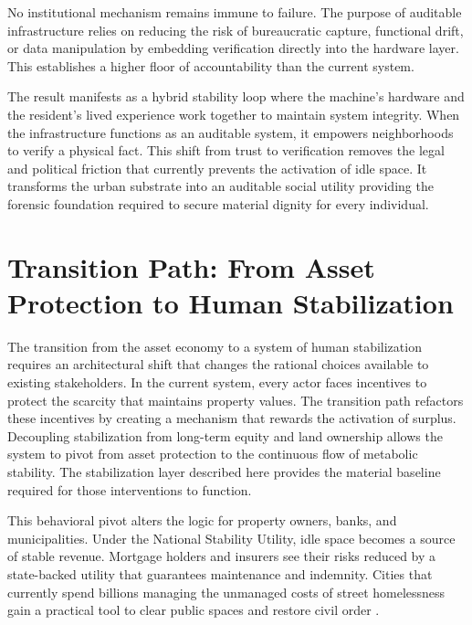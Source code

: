 \documentclass[12pt, letterpaper]{article}
\begin{document}
No institutional mechanism remains immune to failure. The purpose of auditable infrastructure relies on reducing the risk of bureaucratic capture, functional drift, or data manipulation by embedding verification directly into the hardware layer. This establishes a higher floor of accountability than the current system.

The result manifests as a hybrid stability loop where the machine's hardware and the resident's lived experience work together to maintain system integrity. When the infrastructure functions as an auditable system, it empowers neighborhoods to verify a physical fact. This shift from trust to verification removes the legal and political friction that currently prevents the activation of idle space. It transforms the urban substrate into an auditable social utility providing the forensic foundation required to secure material dignity for every individual.

\section{Transition Path: From Asset Protection to Human Stabilization}

The transition from the asset economy to a system of human stabilization requires an architectural shift that changes the rational choices available to existing stakeholders. In the current system, every actor faces incentives to protect the scarcity that maintains property values. The transition path refactors these incentives by creating a mechanism that rewards the activation of surplus. Decoupling stabilization from long-term equity and land ownership allows the system to pivot from asset protection to the continuous flow of metabolic stability. The stabilization layer described here provides the material baseline required for those interventions to function.

This behavioral pivot alters the logic for property owners, banks, and municipalities. Under the National Stability Utility, idle space becomes a source of stable revenue. Mortgage holders and insurers see their risks reduced by a state-backed utility that guarantees maintenance and indemnity. Cities that currently spend billions managing the unmanaged costs of street homelessness gain a practical tool to clear public spaces and restore civil order \citep{grants_pass_2024}.
\end{document}
